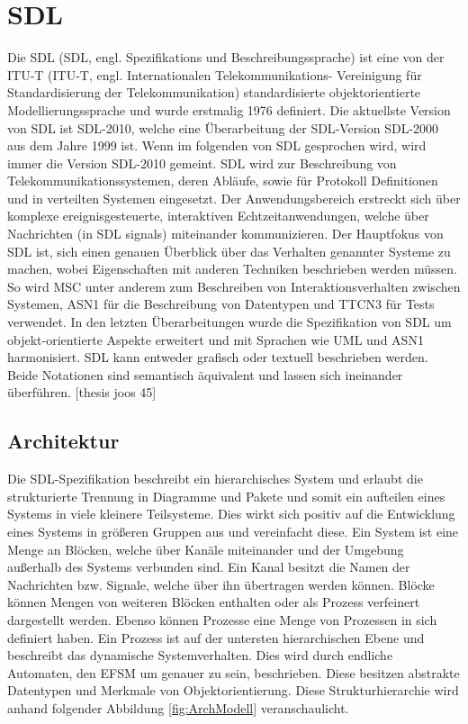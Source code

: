 \section{\acf{SDL}}
\label{sc:SDL}
Die \ac{SDL} (\ac{SDL}, engl. Spezifikations und Beschreibungssprache) ist eine von der \ac{ITU-T} (\ac{ITU-T}, engl. Internationalen 
Telekommunikations- Vereinigung für Standardisierung der Telekommunikation) standardisierte objektorientierte Modellierungssprache und wurde erstmalig 
1976 definiert. Die aktuellste Version von \ac{SDL} ist \ac{SDL}-2010, welche eine Überarbeitung der \ac{SDL}-Version \ac{SDL}-2000 aus dem Jahre 
1999 ist. Wenn im folgenden von \ac{SDL} gesprochen wird, wird immer die Version \acs{SDL}-2010 gemeint. 
\ac{SDL} wird zur Beschreibung von Telekommunikationssystemen, deren Abläufe, sowie für Protokoll Definitionen und in verteilten Systemen eingesetzt.
Der Anwendungsbereich erstreckt sich über komplexe ereignisgesteuerte, interaktiven Echtzeitanwendungen, welche über Nachrichten (in \ac{SDL} signals) miteinander kommunizieren. 
Der Hauptfokus von \ac{SDL} ist, sich einen genauen Überblick über das Verhalten genannter Systeme zu machen, wobei Eigenschaften mit anderen Techniken beschrieben werden müssen. 
So wird \ac{MSC} unter anderem zum Beschreiben von Interaktionsverhalten zwischen Systemen, \ac{ASN1} für die Beschreibung von Datentypen und \ac{TTCN3} für Tests verwendet. In den letzten Überarbeitungen wurde die Spezifikation von \ac{SDL} um objekt-orientierte Aspekte erweitert und mit Sprachen wie \ac{UML} und \ac{ASN1} harmonisiert. \ac{SDL} kann entweder grafisch oder textuell beschrieben werden. Beide Notationen sind semantisch äquivalent und lassen sich ineinander überführen.
[thesis joos 45]

\subsection{Architektur}
\label{ssc:Architektur}
Die \ac{SDL}-Spezifikation beschreibt ein hierarchisches System und erlaubt die strukturierte Trennung in Diagramme und Pakete und somit ein aufteilen eines Systems in viele kleinere Teilsysteme. Dies wirkt sich positiv auf die Entwicklung eines Systems in größeren Gruppen aus und vereinfacht diese. Ein System ist eine Menge an Blöcken, welche über Kanäle miteinander und der Umgebung außerhalb des Systems verbunden sind. Ein Kanal besitzt die Namen der Nachrichten bzw. Signale, welche über ihn übertragen werden können. Blöcke können Mengen von weiteren Blöcken enthalten oder  als Prozess verfeinert dargestellt werden. Ebenso können Prozesse eine Menge von Prozessen in sich definiert haben.
Ein Prozess ist auf der untersten hierarchischen Ebene und beschreibt das dynamische Systemverhalten. Dies wird durch endliche Automaten, den \ac{EFSM} um genauer zu sein, beschrieben. Diese besitzen abstrakte Datentypen und Merkmale von Objektorientierung. Diese Strukturhierarchie wird anhand folgender Abbildung \ref{fig:ArchModell} veranschaulicht.
 
